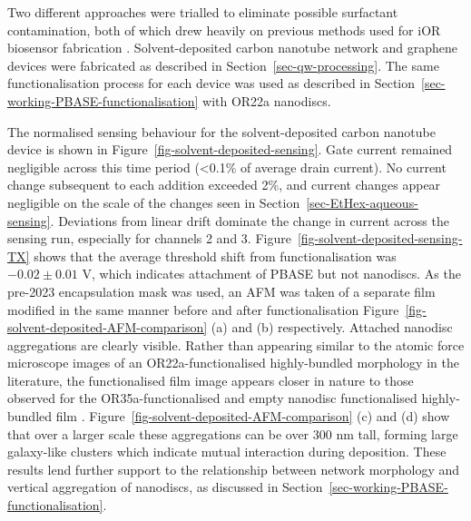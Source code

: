 \documentclass[
  a4paper,
]{scrbook}
\begin{document}
Two different approaches were trialled to eliminate possible surfactant
contamination, both of which drew heavily on previous methods used for
iOR biosensor fabrication \autocite{Murugathas2019a,Murugathas2020}.
Solvent-deposited carbon nanotube network and graphene devices were
fabricated as described in Section~\ref{sec-qw-processing}. The same
functionalisation process for each device was used as described in
Section~\ref{sec-working-PBASE-functionalisation} with OR22a nanodiscs.

The normalised sensing behaviour for the solvent-deposited carbon
nanotube device is shown in Figure~\ref{fig-solvent-deposited-sensing}.
Gate current remained negligible across this time period (\textless0.1\%
of average drain current). No current change subsequent to each addition
exceeded 2\%, and current changes appear negligible on the scale of the
changes seen in Section~\ref{sec-EtHex-aqueous-sensing}. Deviations from
linear drift dominate the change in current across the sensing run,
especially for channels 2 and 3.
Figure~\ref{fig-solvent-deposited-sensing-TX} shows that the average
threshold shift from functionalisation was \(-0.02\pm0.01\) V, which
indicates attachment of PBASE but not nanodiscs. As the pre-2023
encapsulation mask was used, an AFM was taken of a separate film
modified in the same manner before and after functionalisation
Figure~\ref{fig-solvent-deposited-AFM-comparison} (a) and (b)
respectively. Attached nanodisc aggregations are clearly visible. Rather
than appearing similar to the atomic force microscope images of an
OR22a-functionalised highly-bundled morphology in the literature, the
functionalised film image appears closer in nature to those observed for
the OR35a-functionalised and empty nanodisc functionalised
highly-bundled film \autocite{Murugathas2019a}.
Figure~\ref{fig-solvent-deposited-AFM-comparison} (c) and (d) show that
over a larger scale these aggregations can be over 300 nm tall, forming
large galaxy-like clusters which indicate mutual interaction during
deposition. These results lend further support to the relationship
between network morphology and vertical aggregation of nanodiscs, as
discussed in Section~\ref{sec-working-PBASE-functionalisation}.
\end{document}
